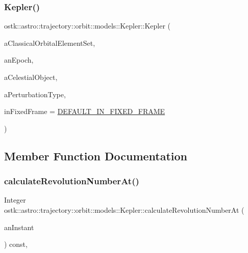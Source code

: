 \subsubsection{\texorpdfstring{Kepler()}{Kepler()}\hspace{0.1cm}{\footnotesize\ttfamily [2/2]}}
{\footnotesize\ttfamily ostk\+::astro\+::trajectory\+::orbit\+::models\+::\+Kepler\+::\+Kepler (\begin{DoxyParamCaption}\item[{const \hyperlink{classostk_1_1astro_1_1trajectory_1_1orbit_1_1models_1_1kepler_1_1_c_o_e}{C\+OE} \&}]{a\+Classical\+Orbital\+Element\+Set,  }\item[{const Instant \&}]{an\+Epoch,  }\item[{const Celestial \&}]{a\+Celestial\+Object,  }\item[{const \hyperlink{classostk_1_1astro_1_1trajectory_1_1orbit_1_1models_1_1_kepler_a3750f9177ff06a1938826e2c2881d5a9}{Kepler\+::\+Perturbation\+Type} \&}]{a\+Perturbation\+Type,  }\item[{const bool}]{in\+Fixed\+Frame = {\ttfamily \hyperlink{_kepler_8hpp_a42fbab7c9532a311984a768a10f815aa}{D\+E\+F\+A\+U\+L\+T\+\_\+\+I\+N\+\_\+\+F\+I\+X\+E\+D\+\_\+\+F\+R\+A\+ME}} }\end{DoxyParamCaption})}



\subsection{Member Function Documentation}
\mbox{\label{classostk_1_1astro_1_1trajectory_1_1orbit_1_1models_1_1_kepler_a312fe4296eadcb00799ce9981b0c4f18}} 
\subsubsection{\texorpdfstring{calculate\+Revolution\+Number\+At()}{calculateRevolutionNumberAt()}}
{\footnotesize\ttfamily Integer ostk\+::astro\+::trajectory\+::orbit\+::models\+::\+Kepler\+::calculate\+Revolution\+Number\+At (\begin{DoxyParamCaption}\item[{const Instant \&}]{an\+Instant }\end{DoxyParamCaption}) const\hspace{0.3cm}{\ttfamily [override]}, {\ttfamily [virtual]}}



